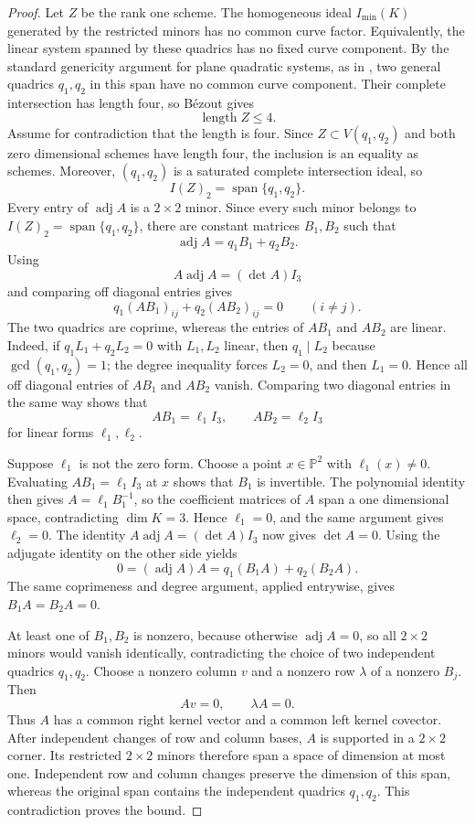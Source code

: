 \documentclass[11pt]{amsart}
\newcommand{\chg}[1]{#1}
\newcommand{\newrev}[1]{#1}
\newcommand{\Span}{\operatorname{span}}
\theoremstyle{plain}
\theoremstyle{definition}
\theoremstyle{remark}
\begin{document}
\begin{proof}
Let $Z$ be the \chg{rank one} scheme. The homogeneous ideal {$I_{\min}(K)$} generated by the restricted minors has no common curve factor. \newrev{Equivalently, the linear system spanned by these quadrics has no fixed curve component. By the standard genericity argument for plane quadratic systems, as in \cite[Lemma~4.1]{GesmundoKeneshlou2026}, two general quadrics $q_1,q_2$ in this span have no common curve component.} Their complete intersection has length four, so B\'ezout gives
\[
\operatorname{length}Z\le4.
\]
Assume for contradiction that the length is four. Since $Z\subset V(q_1,q_2)$ and both \chg{zero dimensional} schemes have length four, the inclusion is an equality \chg{as schemes}. Moreover, $(q_1,q_2)$ is a saturated \chg{complete intersection} ideal, so
\[
I(Z)_2=\Span\{q_1,q_2\}.
\]
Every entry of $\operatorname{adj}A$ is a $2\times2$ minor. \newrev{Since every such minor belongs to $I(Z)_2=\Span\{q_1,q_2\}$,} there are constant matrices $B_1,B_2$ such that
\[
\operatorname{adj}A=q_1B_1+q_2B_2.
\]
Using
\[
A\operatorname{adj}A=(\det A)I_3
\]
and comparing \chg{off diagonal} entries gives
\[
q_1(AB_1)_{ij}+q_2(AB_2)_{ij}=0\qquad(i\ne j).
\]
The two quadrics are coprime, whereas the entries of $AB_1$ and $AB_2$ are linear. \newrev{Indeed, if $q_1L_1+q_2L_2=0$ with $L_1,L_2$ linear, then $q_1\mid L_2$ because $\gcd(q_1,q_2)=1$; the degree inequality forces $L_2=0$, and then $L_1=0$.} Hence all \chg{off diagonal} entries of $AB_1$ and $AB_2$ vanish. Comparing two diagonal entries in the same way shows that
\[
AB_1=\ell_1 I_3,\qquad AB_2=\ell_2 I_3
\]
for linear forms $\ell_1,\ell_2$.

\chg{Suppose $\ell_1$ is not the zero form. Choose a point $x\in\mathbb P^2$ with $\ell_1(x)\ne0$. Evaluating $A B_1=\ell_1I_3$ at $x$ shows that $B_1$ is invertible. The polynomial identity then gives $A=\ell_1B_1^{-1}$, so the coefficient matrices of $A$ span a one dimensional space, contradicting $\dim K=3$. Hence $\ell_1=0$, and the same argument gives $\ell_2=0$.}
The identity $A\operatorname{adj}A=(\det A)I_3$ now gives $\det A=0$. Using the adjugate identity on the other side yields
\[
0=(\operatorname{adj}A)A=q_1(B_1A)+q_2(B_2A).
\]
The same \chg{coprimeness and degree argument}, applied entrywise, gives $B_1A=B_2A=0$.

\chg{At least one of $B_1,B_2$ is nonzero, because otherwise $\operatorname{adj}A=0$, so all $2\times2$ minors would vanish identically, contradicting the choice of two independent quadrics $q_1,q_2$.} Choose a nonzero column $v$ and a nonzero row $\lambda$ of a nonzero $B_j$. Then
\[
Av=0,\qquad \lambda A=0.
\]
Thus $A$ has a common right kernel vector and a common left kernel covector. After independent changes of row and column bases, $A$ is supported in a $2\times2$ corner. Its restricted $2\times2$ minors therefore span a space of dimension at most one. Independent row and column changes preserve the dimension of this span, whereas the original span contains the independent quadrics $q_1,q_2$. This contradiction proves the bound.
\end{proof}
\end{document}
